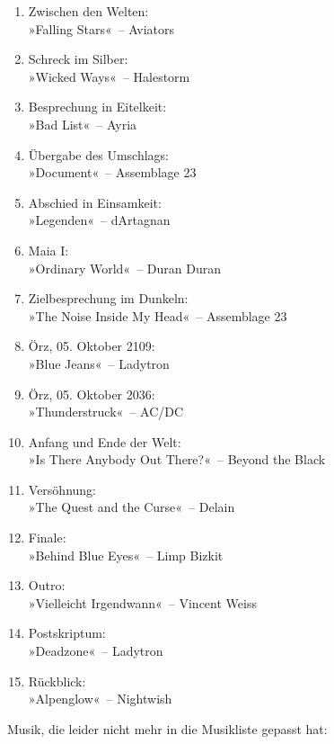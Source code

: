 \begin{enumerate}
    \item Zwischen den Welten:\\ »Falling Stars«~– Aviators
    \item Schreck im Silber:\\ »Wicked Ways«~– Halestorm
    \item Besprechung in Eitelkeit:\\ »Bad List«~– Ayria
    \item Übergabe des Umschlags:\\ »Document«~– Assemblage 23
    \item Abschied in Einsamkeit:\\ »Legenden«~– dArtagnan
    \item Maia I:\\ »Ordinary World«~– Duran Duran
    \item Zielbesprechung im Dunkeln:\\ »The Noise Inside My Head«~– Assemblage 23
    \item Örz, 05. Oktober 2109:\\ »Blue Jeans«~– Ladytron
    \item Örz, 05. Oktober 2036:\\ »Thunderstruck«~– AC/DC
    \item Anfang und Ende der Welt:\\ »Is There Anybody Out There?«~– Beyond the Black
    \item Versöhnung:\\ »The Quest and the Curse«~– Delain
    \item Finale:\\ »Behind Blue Eyes«~– Limp Bizkit
    \item Outro:\\ »Vielleicht Irgendwann«~– Vincent Weiss
    \item Postskriptum:\\ »Deadzone«~– Ladytron
    \item Rückblick:\\ »Alpenglow«~– Nightwish
\end{enumerate}

Musik, die leider nicht mehr in die Musikliste gepasst hat:

